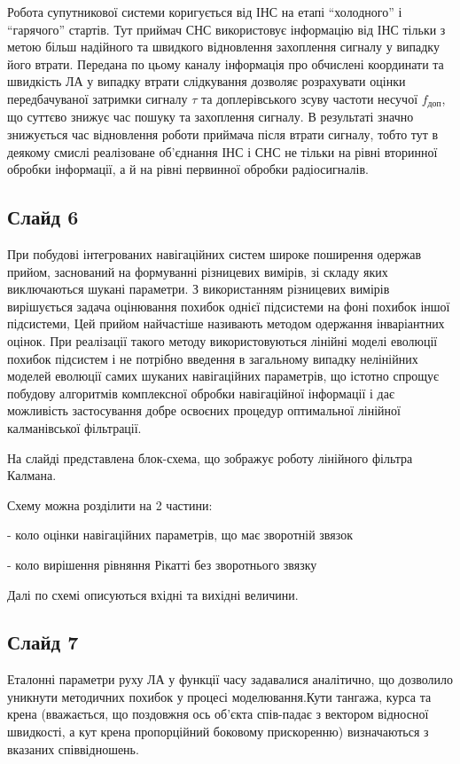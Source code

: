 \documentclass[ukrainian,utf8,simple,floatsubsection, hpadding=1mm,equationsubsection,]{eskdtext}
\begin{document}
Робота супутникової системи коригується від ІНС на етапі ``холодного'' і ``гарячого'' 
стартів. Тут приймач СНС використовує інформацію від ІНС тільки з метою 
більш надійного та швидкого відновлення захоплення сигналу у випадку його втрати. Передана по цьому 
каналу інформація про обчислені координати та швидкість ЛА у випадку втрати слідкування 
дозволяє розрахувати оцінки передбачуваної затримки сигналу $\tau$ та доплерівського 
зсуву частоти несучої $f_{\text{доп}}$, що суттєво знижує час пошуку та захоплення сигналу. 
В результаті значно знижується час відновлення роботи приймача після втрати сигналу, тобто тут в деякому смислі реалізоване об'єднання ІНС і СНС не тільки на рівні вторинної обробки інформації, а й на рівні 
первинної обробки радіосигналів. 

\subsection*{Слайд 6}

При побудові інтегрованих  навігаційних систем широке поширення одержав прийом, 
заснований на формуванні різницевих вимірів, зі складу яких виключаються шукані 
параметри. З використанням різницевих вимірів  вирішується задача оцінювання 
похибок однієї підсистеми на фоні похибок іншої підсистеми, Цей прийом  найчастіше 
називають методом одержання інваріантних оцінок. При реалізації такого методу 
використовуються лінійні моделі еволюції похибок підсистем  і не потрібно введення 
в загальному випадку нелінійних моделей еволюції самих шуканих навігаційних параметрів, 
що істотно спрощує побудову алгоритмів комплексної обробки навігаційної інформації і 
дає можливість застосування добре освоєних процедур оптимальної  лінійної калманівської 
фільтрації. 

На слайді представлена блок-схема, що зображує роботу лінійного фільтра Калмана.

Схему можна розділити на 2 частини:

- коло оцінки навігаційних параметрів, що має зворотній звязок

- коло вирішення рівняння Рікатті без зворотнього звязку 

Далі по схемі описуються вхідні та вихідні величини.

\subsection*{Слайд 7}
Еталонні параметри руху ЛА у функції часу задавалися аналітично, що дозволило уникнути методичних похибок у процесі моделювання.Кути тангажа, курса та крена (вважається, що поздовжня ось об’єкта спів-падає з вектором відносної швидкості, а кут крена пропорційний боковому прискоренню) визначаються з вказаних співвідношень.
\end{document}
